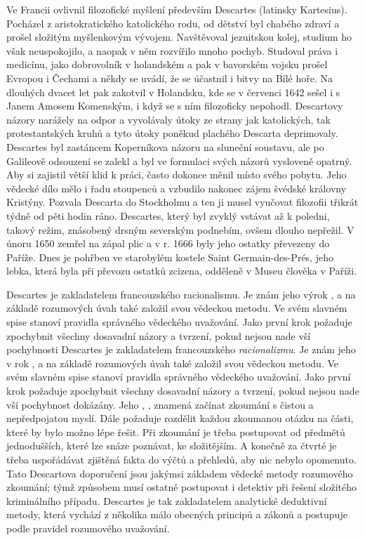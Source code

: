     Ve Francii ovlivnil filozofické myšlení především Descartes (latinsky Kartesius). Pocházel z
    aristokratického katolického rodu, od dětství byl chabého zdraví a prošel složitým myšlenkovým
    vývojem. Navštěvoval jezuitskou kolej, studium ho však neuspokojilo, a naopak v něm rozvířilo
    mnoho pochyb. Studoval práva i medicínu, jako dobrovolník v holandském a pak v bavorském vojsku
    prošel Evropou i Čechami a někdy se uvádí, že se účastnil i bitvy na Bílé hoře.  Na dlouhých
    dvacet let pak zakotvil v Holandsku, kde se v červenci 1642 sešel i s Janem Amosem Komenským, i
    když se s ním filozoficky nepohodl. Descartovy názory narážely na odpor a vyvolávaly útoky ze
    strany jak katolických, tak protestantských kruhů a tyto útoky poněkud plachého Descarta
    deprimovaly. Descartes byl zastáncem Koperníkova názoru na sluneční soustavu, ale po Galileově
    odsouzení se zalekl a byl ve formulaci svých názorů vysloveně opatrný. Aby si zajistil větší
    klid k práci, často dokonce měnil místo svého pobytu. Jeho vědecké dílo mělo i řadu stoupenců a
    vzbudilo nakonec zájem švédské královny Kristýny. Pozvala Descarta do Stockholmu a ten ji musel
    vyučovat filozofii třikrát týdně od pěti hodin ráno. Descartes, který byl zvyklý vstávat až k
    poledni, takový režim, znásobený drsným severským podnebím, ovšem dlouho nepřežil. V únoru 1650
    zemřel na zápal plic a v r. 1666 byly jeho ostatky převezeny do Paříže. Dnes je pohřben ve
    starobylém kostele Saint Germain-des-Prés, jeho lebka, která byla při převozu ostatků zcizena,
    odděleně v Museu člověka v Paříži. 
    
    Descartes je zakladatelem francouzského racionalismu. Je znám jeho výrok ,
     a na základě rozumových úvah také založil svou vědeckou metodu. Ve svém
    slavném spise  stanoví pravidla správného vědeckého uvažování. Jako první
    krok požaduje zpochybnit všechny dosavadní názory a tvrzení, pokud nejsou nade vší pochybnosti
    Descartes je zakladatelem francouzského \emph{racionalizmu}. Je znám jeho v rok ,  a na základě rozumových úvah také založil svou vědeckou metodu. Ve
    svém slavném spise  stanoví pravidla správného vědeckého uvažování. Jako
    první krok požaduje zpochybnit všechny dosavadní názory a tvrzení, pokud nejsou nade vší
    pochybnost dokázány. Jeho , , znamená začínat
    zkoumání s čistou a nepředpojatou myslí. Dále požaduje rozdělit každou zkoumanou otázku na
    části, které by bylo možno lépe řešit. Při zkoumání je třeba postupovat od předmětů
    jednodušších, které lze snáze poznávat, ke složitějším. A konečně za čtvrté je třeba uspořádávat
    zjištěná fakta do výčtů a přehledů, aby nic nebylo opomenuto. Tato Descartova doporučení jsou
    jakýmsi základem vědecké metody rozumového zkoumání; týmž způsobem musí ostatně postupovat i
    detektiv při řešení složitého kriminálního případu. Descartes je tak zakladatelem analytické
    deduktivní metody, která vychází z několika málo obecných principů a zákonů a postupuje podle
    pravidel rozumového uvažování.

